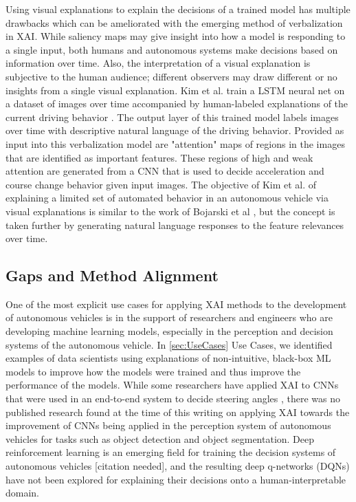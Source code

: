 Using visual explanations to explain the decisions of a trained model has multiple drawbacks which can be ameliorated with the emerging method of verbalization in XAI.  While saliency maps may give insight into how a model is responding to a single input, both humans and autonomous systems make decisions based on information over time.  Also, the interpretation of a visual explanation is subjective to the human audience; different observers may draw different or no insights from a single visual explanation.  Kim et al. train a LSTM neural net on a dataset of images over time accompanied by human-labeled explanations of the current driving behavior \cite{kim2018textual}.  The output layer of this trained model labels images over time with descriptive natural language of the driving behavior.  Provided as input into this verbalization model are "attention" maps of regions in the images that are identified as important features.  These regions of high and weak attention are generated from a CNN that is used to decide acceleration and course change behavior given input images.  The objective of Kim et al. of explaining a limited set of automated behavior in an autonomous vehicle via visual explanations is similar to the work of Bojarski et al \cite{Bojarski2017ExplainingHA}, but the concept is taken further by generating natural language responses to the feature relevances over time.

\subsection{Gaps and Method Alignment}

One of the most explicit use cases for applying XAI methods to the development of autonomous vehicles is in the support of researchers and engineers who are developing machine learning models, especially in the perception and decision systems of the autonomous vehicle.  In \ref{sec:UseCases} Use Cases, we identified examples of data scientists using explanations of non-intuitive, black-box ML models to improve how the models were trained and thus improve the performance of the models.  While some researchers have applied XAI to CNNs that were used in an end-to-end system to decide steering angles \cite{Bojarski2017ExplainingHA}, there was no published research found at the time of this writing on applying XAI towards the improvement of CNNs being applied in the perception system of autonomous vehicles for tasks such as object detection and object segmentation.  Deep reinforcement learning is an emerging field for training the decision systems of autonomous vehicles [citation needed], and the resulting deep q-networks (DQNs) have not been explored for explaining their decisions onto a human-interpretable domain.  


